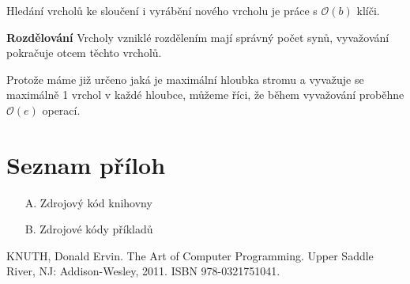 \documentclass[a4paper,11pt,openany]{article}
\begin{document}
Hledání vrcholů ke sloučení i vyrábění nového vrcholu je práce s $ \mathcal{O}(b) $ klíči.

\textbf{Rozdělování} Vrcholy vzniklé rozdělením mají správný počet synů, vyvažování pokračuje otcem těchto vrcholů.

Protože máme již určeno jaká je maximální hloubka stromu a vyvažuje se maximálně 1 vrchol v každé hloubce, můžeme říci, že během vyvažování proběhne $ \mathcal{O}(e) $ operací.

\listoffigures
\listoftables
\section*{Seznam příloh}
\begin{enumerate}
	\item[A.] Zdrojový kód knihovny
	\item[B.] Zdrojové kódy příkladů
\end{enumerate}
\begin{thebibliography}{10}
	KNUTH, Donald Ervin. The Art of Computer Programming. Upper Saddle River, NJ: Addison-Wesley, 2011. ISBN 978-0321751041.
\end{thebibliography}
\end{document}
